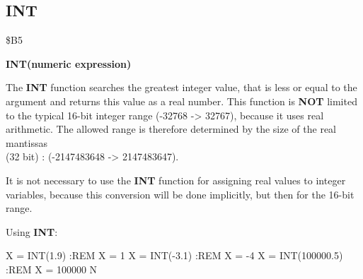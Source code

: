 \subsection{INT}
\begin{description}[leftmargin=3cm,style=nextline]
\item [Token:] \$B5
\item [Format:] {\bf INT(numeric expression)}
\item [Usage:] The {\bf INT} function searches the greatest
               integer value, that is less or equal to the argument
               and returns this value as a real number.
               This function is {\bf NOT} limited to the typical
               16-bit integer range (-32768 -> 32767), because
               it uses real arithmetic. The allowed range is
               therefore determined by the size of the real
               mantissas \\
               (32 bit) : (-2147483648 -> 2147483647).

\item [Remarks:] It is not necessary to use the {\bf INT}
               function for assigning real values to integer
               variables, because this conversion will be done
               implicitly, but then for the 16-bit range.

\item [Example:] Using {\bf INT}:
\begin{screenoutput}
 X  = INT(1.9)       :REM X = 1
 X  = INT(-3.1)      :REM X = -4
 X  = INT(100000.5)  :REM X = 100000
 N%
\end{screenoutput}
\end{description}


\newpage
